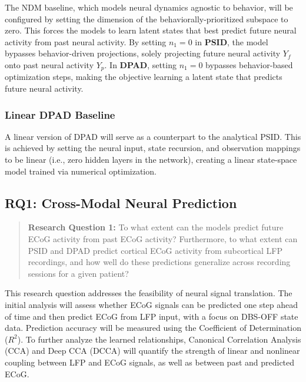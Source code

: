\documentclass[12pt, a4paper]{article}
\begin{document}
The NDM baseline, which models neural dynamics agnostic to behavior, will be configured by setting the dimension of the behaviorally-prioritized subspace to zero. This forces the models to learn latent states that best predict future neural activity from past neural activity. By setting $n_1 = 0$ in \textbf{PSID}, the model bypasses behavior-driven projections, solely projecting future neural activity $Y_f$ onto past neural activity $Y_p$. In \textbf{DPAD}, setting $n_1 = 0$ bypasses behavior-based optimization steps, making the objective learning a latent state that predicts future neural activity.

\subsubsection{Linear DPAD Baseline}

A linear version of DPAD will serve as a counterpart to the analytical PSID. This is achieved by setting the neural input, state recursion, and observation mappings to be linear (i.e., zero hidden layers in the network), creating a linear state-space model trained via numerical optimization.

\subsection{RQ1: Cross-Modal Neural Prediction}

\begin{quote}

    \textbf{Research Question 1:} To what extent can the models predict future ECoG activity from past ECoG activity? Furthermore, to what extent can PSID and DPAD predict cortical ECoG activity from subcortical LFP recordings, and how well do these predictions generalize across recording sessions for a given patient?

\end{quote}

This research question addresses the feasibility of neural signal translation. The initial analysis will assess whether ECoG signals can be predicted one step ahead of time and then predict ECoG from LFP input, with a focus on DBS-OFF state data. Prediction accuracy will be measured using the Coefficient of Determination ($R^2$). To further analyze the learned relationships, Canonical Correlation Analysis (CCA) and Deep CCA (DCCA) will quantify the strength of linear and nonlinear coupling between LFP and ECoG signals, as well as between past and predicted ECoG.
\end{document}
